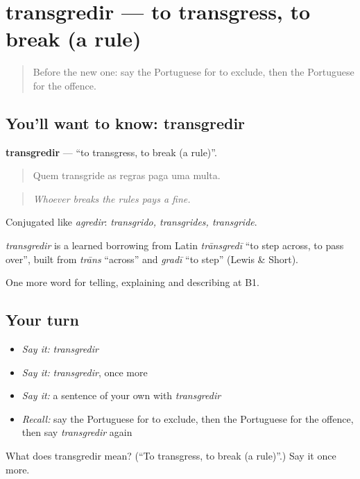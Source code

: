 \section[transgredir]{transgredir — to transgress, to break (a rule)}

\label{lesson:PT-C383-transgredir}



\begin{quote}
Before the new one: say the Portuguese for to exclude, then the Portuguese for the offence.
\end{quote}

\subsection*{You'll want to know: transgredir}
\textbf{transgredir} — \textquotedblleft{}to transgress, to break (a rule)\textquotedblright{}.

\begin{quote}
Quem transgride as regras paga uma multa.
\end{quote}

\begin{quote}
\emph{Whoever breaks the rules pays a fine.}
\end{quote}

Conjugated like \emph{agredir}: \emph{transgrido, transgrides, transgride}.

\begin{cousinweb}
\emph{transgredir} is a learned borrowing from Latin \emph{trānsgredī} \textquotedblleft{}to step across, to pass over\textquotedblright{}, built from \emph{trāns} \textquotedblleft{}across\textquotedblright{} and \emph{gradī} \textquotedblleft{}to step\textquotedblright{} (Lewis \& Short).
\end{cousinweb}

\begin{grammarlens}[title={What you've built}]
One more word for telling, explaining and describing at B1.
\end{grammarlens}

\subsection*{Your turn}
\begin{itemize}
\raggedright
  \item \emph{Say it:} \emph{transgredir}
  \item \emph{Say it:} \emph{transgredir}, once more
  \item \emph{Say it:} a sentence of your own with \emph{transgredir}
  \item \emph{Recall:} say the Portuguese for to exclude, then the Portuguese for the offence, then say \emph{transgredir} again
\end{itemize}

\begin{tcolorbox}[breakable,colback=teal!4,colframe=teal!35!black,title={Before you move on}]
What does transgredir mean? (\textquotedblleft{}To transgress, to break (a rule)\textquotedblright{}.) Say it once more.
\end{tcolorbox}
